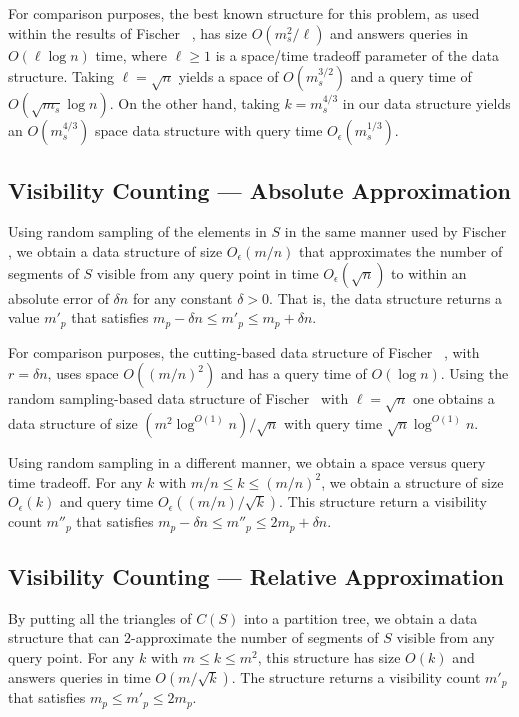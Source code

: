 \documentclass{patmorin}
\newcommand{\Oe}{O_\epsilon}
\begin{document}
For comparison purposes, the best known structure for this problem, as used
within the results of Fischer \etal\ \cite{fXX}, has size $O(m_{s}^2/\ell)$
and answers queries in $O(\ell\log n)$ time, where $\ell \ge 1$ is a
space/time tradeoff parameter of the data structure.  Taking
$\ell=\sqrt{n}$ yields a space of $O(m_s^{3/2})$ and a query time of
$O(\sqrt{m_s}\log n)$.  On the other hand, taking $k=m_s^{4/3}$ in our data
structure yields an $O(m_s^{4/3})$ space data structure with query time
$\Oe(m_s^{1/3})$.

\subsection{Visibility Counting --- Absolute Approximation}

Using random sampling of the elements in $S$ in the same manner used
by Fischer \etal, we obtain a data structure of size $\Oe(m/n)$ that
approximates the number of segments of $S$ visible from any query point
in time $\Oe(\sqrt{n})$ to within an absolute error of $\delta n$ for
any constant $\delta > 0$.  That is, the data structure returns a value
$m'_p$ that satisfies $m_p -\delta n \le m'_p \le m_p+\delta n$.

For comparison purposes, the cutting-based data structure of Fischer \etal\
\cite{fXX}, with $r=\delta n$, uses space $O((m/n)^2)$ and has a query
time of $O(\log n)$.  Using the random sampling-based data structure of
Fischer \etal\ with $\ell=\sqrt{n}$ one obtains a data structure of size
$(m^2\log^{O(1)} n)/\sqrt{n}$ with query time $\sqrt{n}\log^{O(1)} n$.

Using random sampling in a different manner, we obtain a space versus query
time tradeoff. For any $k$ with $m/n \le k \le (m/n)^2$, we obtain a
structure of size $\Oe(k)$ and query time $\Oe((m/n)/\sqrt{k})$.  This
structure return a visibility count $m''_p$ that satisfies $m_p-\delta n
\le m''_p \le 2m_p + \delta n$.

\subsection{Visibility Counting --- Relative Approximation} 

By putting all the triangles of $C(S)$ into a partition tree, we obtain
a data structure that can $2$-approximate the number of segments of $S$
visible from any query point.  For any $k$ with $m\le k\le m^2$, this
structure has size $O(k)$ and answers queries in time $O(m/\sqrt{k})$.  The
structure returns a visibility count $m'_p$ that satisfies $m_p \le m'_p\le
2m_p$.
\end{document}
